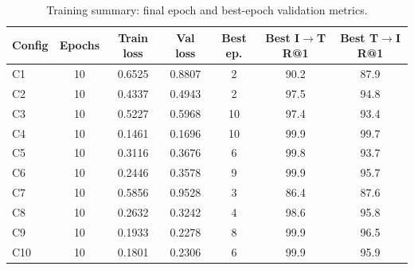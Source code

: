 \begin{table}[t]
\centering
\caption{Training summary: final epoch and best-epoch validation metrics.}
\label{tab:training_dynamics}
\small
\setlength{\tabcolsep}{5pt}
\begin{tabular}{lcccccc}
\toprule
\textbf{Config} & \textbf{Epochs} & \textbf{Train loss} & \textbf{Val loss} & \textbf{Best ep.} & \textbf{Best I$\to$T R@1} & \textbf{Best T$\to$I R@1} \\
\midrule
C1 & 10 & 0.6525 & 0.8807 & 2 & 90.2 & 87.9 \\
C2 & 10 & 0.4337 & 0.4943 & 2 & 97.5 & 94.8 \\
C3 & 10 & 0.5227 & 0.5968 & 10 & 97.4 & 93.4 \\
C4 & 10 & 0.1461 & 0.1696 & 10 & 99.9 & 99.7 \\
C5 & 10 & 0.3116 & 0.3676 & 6 & 99.8 & 93.7 \\
C6 & 10 & 0.2446 & 0.3578 & 9 & 99.9 & 95.7 \\
C7 & 10 & 0.5856 & 0.9528 & 3 & 86.4 & 87.6 \\
C8 & 10 & 0.2632 & 0.3242 & 4 & 98.6 & 95.8 \\
C9 & 10 & 0.1933 & 0.2278 & 8 & 99.9 & 96.5 \\
C10 & 10 & 0.1801 & 0.2306 & 6 & 99.9 & 95.9 \\
\bottomrule
\end{tabular}
\end{table}
